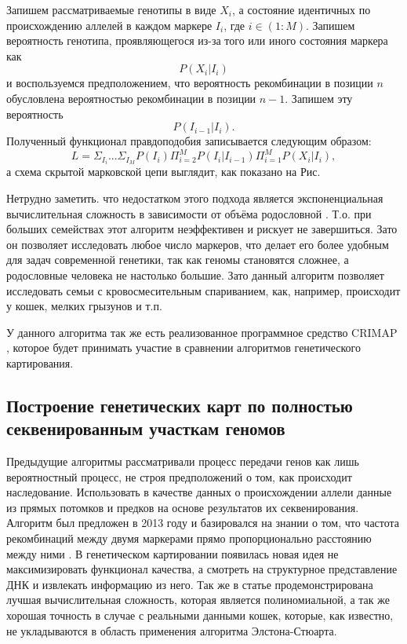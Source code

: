 \documentclass{matmex-diploma-custom}
\begin{document}
Запишем рассматриваемые генотипы в виде $X_{i}$, а состояние
идентичных по происхождению аллелей в каждом маркере $I_{i}$, где $i
\in (1:M)$. Запишем вероятность генотипа, проявляющегося из-за того
или иного состояния маркера как $$P( X_{i} | I_{i})$$ и воспользуемся
предположением, что вероятность рекомбинации в позиции $n$ обусловлена
вероятностью рекомбинации в позиции $n-1$. Запишем эту
вероятность $$P(I_{i-1}|I_{i}).$$ Полученный функционал правдоподобия
записывается следующим образом: $$L =
\Sigma_{I_{i}}...\Sigma_{I_{M}}P(I_{i})\Pi_{i=2}^{M}P(I_{i}|I_{i-1})\Pi^{M}_{i=1}P(X_{i}|I_{i}),$$
а схема скрытой марковской цепи выглядит, как показано на Рис.

Нетрудно заметить. что недостатком этого подхода является
экспоненциальная вычислительная сложность в зависимости от объёма
родословной \cite{lander, fishelson2002exact}. Т.о. при больших
семействах этот алгоритм неэффективен и рискует не завершиться. Зато
он позволяет исследовать любое число маркеров, что делает его более
удобным для задач современной генетики, так как геномы становятся
сложнее, а родословные человека не настолько большие. Зато данный
алгоритм позволяет исследовать семьи с кровосмесительным спариванием,
как, например, происходит у кошек, мелких грызунов и т.п.

У данного алгоритма так же есть реализованное программное средство
CRIMAP \cite{crimap}, которое будет принимать участие в сравнении
алгоритмов генетического картирования.

\subsection{Построение генетических карт по полностью секвенированным
участкам геномов}

Предыдущие алгоритмы рассматривали процесс передачи генов как лишь
вероятностный процесс, не строя предположений о том, как происходит
наследование. Использовать в качестве данных о происхождении аллели
данные из прямых потомков и предков на основе результатов их
секвенирования. Алгоритм был предложен в 2013 году и базировался на
знании о том, что частота рекомбинаций между двумя маркерами прямо
пропорционально расстоянию между ними \cite{sysoev}. В генетическом
картировании появилась новая идея не максимизировать функционал
качества, а смотреть на структурное представление ДНК и извлекать
информацию из него. Так же в статье \cite{sysoev} продемонстрирована
лучшая вычислительная сложность, которая является полиномиальной, а
так же хорошая точность в случае с реальными данными кошек, которые,
как известно, не укладываются в область применения алгоритма
Элстона-Стюарта.
\end{document}
